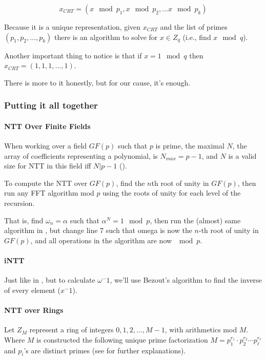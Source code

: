 $$ x_{CRT} = (x\mod p_1, x\mod p_2 ,\dots x\mod p_k ) $$



Because it is a unique representation, given $x_{CRT}$ and the list of
 primes $(p_1,p_2,\dots,p_k)$ there is an algorithm to solve for $x \in Z_q$
 (i.e., find $x \mod q$).


Another important thing to notice is that if  $x=1 \mod q$
 then $x_{CRT}= (1,1,1,\dots,1)$.


There is more to it honestly, but for our cause, it's enough.

\subsubsection{Putting it all together}

\paragraph[NTT Over Finite Fields]{\bf NTT Over Finite Fields} \label{ntt-field}
When working over a field $GF(p)$ such that $p$ is prime,
the maximal $N$, the array of coefficients representing a
polynomial, is $N_{max}=p-1$, and $N$ is a valid size for NTT
 in this field iff $N|p-1$ (\cite[III. number theoretic transforms]{ntt}). 


To compute the NTT over $GF(p)$, find the $n$th root of unity in $GF(p)$,
 then run any FFT algorithm mod $p$ using the roots
of unity for each level of the recursion.

That is, find $\omega_n=\alpha$ such that $\alpha^N=1 \mod p$, 
then run the (almost) same algorithm in , 
but change line 7 such that omega is now the $n$-th root of unity in $GF(p)$, and
all operations in the algorithm are now $\mod p$.

\paragraph{\bf iNTT}
Just like in , but to calculate $\omega^-1$, we'll
use Bezout's algorithm to find the inverse of every element ($x^-1$).



\paragraph[short]{\bf NTT over Rings}
Let $Z_M$ represent a ring of integers ${0,1,2,\dots , M-1}$,
with arithmetics mod $M$.
Where $M$ is constructed the following unique prime factorization
$M=p_{1}^{r_1}\cdot  p_{2}^{r_2} \cdots p_{\ell}^{r_\ell}$
and $p_i$'s are distinct primes (see \cite[NTT sec. III][]{ntt}
 for further explanations).

